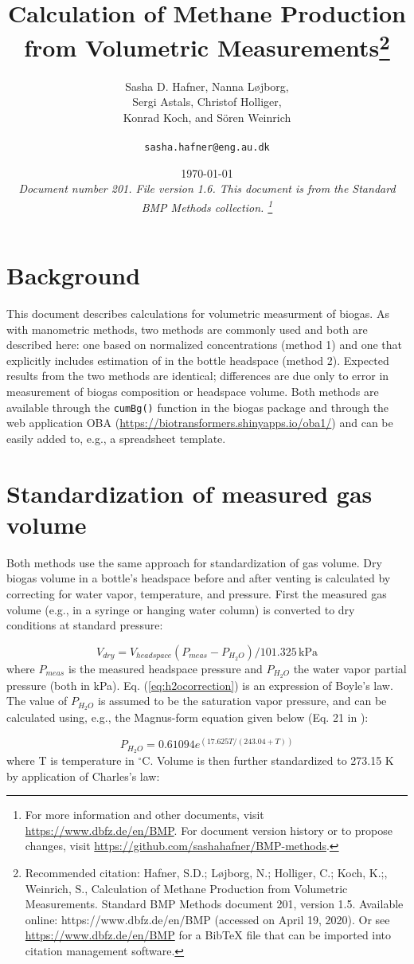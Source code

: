 \documentclass[]{article}
\title {Calculation of Methane Production from Volumetric Measurements\footnote{
  Recommended citation: 
Hafner, S.D.; L\o jborg, N.; Holliger, C.; Koch, K.;, Weinrich, S., Calculation of Methane Production from Volumetric Measurements. Standard BMP Methods document 201, version 1.5. Available online: https://www.dbfz.de/en/BMP (accessed on April 19, 2020).
\newline
  Or see \url{https://www.dbfz.de/en/BMP} for a BibTeX file that can be imported into citation management software.
}}
\author{Sasha D. Hafner, Nanna L\o jborg, \\ Sergi Astals, Christof Holliger, \\ Konrad Koch, and S{\"o}ren Weinrich\\
\\
\texttt{sasha.hafner@eng.au.dk}
}
\date{\today \\
\bigskip
\textit{
  Document number 201.
  File version 1.6. 
  This document is from the Standard BMP Methods collection.
    \footnote{For more information and other documents, visit \url{https://www.dbfz.de/en/BMP}. 
    For document version history or to propose changes, visit \url{https://github.com/sashahafner/BMP-methods}.}
}
}
\newcommand{\unit}[1]{\ensuremath{\, \mathrm{#1}}}
\begin{document}
\maketitle

\section{Background}
This document describes calculations for volumetric measurment of biogas.
As with manometric methods, two methods are commonly used and both are described here: one based on normalized  concentrations (method 1) and one that explicitly includes estimation of  in the bottle headspace (method 2).
Expected results from the two methods are identical; differences are due only to error in measurement of biogas composition or headspace volume.
Both methods are available through the \texttt{cumBg()} function in the biogas package \cite{softwarex} and through the web application OBA (\url{https://biotransformers.shinyapps.io/oba1/}) and can be easily added to, e.g., a spreadsheet template.

\section{Standardization of measured gas volume}
Both methods use the same approach for standardization of gas volume.
Dry biogas volume in a bottle's headspace before and after venting is calculated by correcting for water vapor, temperature, and pressure.
First the measured gas volume (e.g., in a syringe or hanging water column) is converted to dry conditions at standard pressure:

\begin{equation}
  \label{eq:h2ocorrection}
  V_{dry} = V_{headspace}(P_{meas} - P_{H_2O})/101.325 \unit{kPa}
\end{equation}
where $P_{meas}$ is the measured headspace pressure and $P_{H_2O}$ the water vapor partial pressure (both in kPa).
Eq. (\ref{eq:h2ocorrection}) is an expression of Boyle's law.
The value of $P_{H_2O}$ is assumed to be the saturation vapor pressure, and can be calculated using, e.g., the Magnus-form equation given below (Eq. 21 in \cite{magnus}):

\begin{equation}
\label{eq:magnus}
   P_{H_2O} = 0.61094 e^{(17.625 T/(243.04 + T))}
\end{equation}
where T is temperature in $^\circ$C.
Volume is then further standardized to 273.15 K by application of Charles's law:
\end{document}
